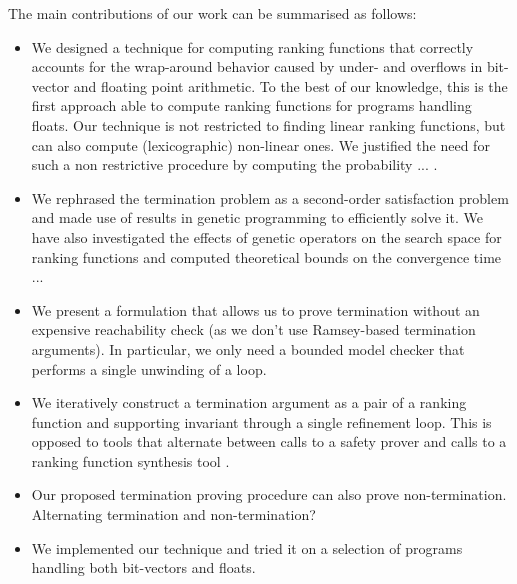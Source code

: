 \documentclass[preprint]{sigplanconf}
\theoremstyle{definition}
\begin{document}
 The main contributions of our work can be summarised as follows:
\begin{itemize}
\item We designed a technique for computing ranking functions that correctly accounts for the wrap-around behavior caused by under- and overflows in bit-vector and floating point arithmetic. To the best of our knowledge, this is the first approach able to compute ranking functions for programs handling floats. Our technique is not restricted to finding linear ranking functions, but can also compute (lexicographic) non-linear  ones. We justified the need for such a non restrictive procedure by computing the probability ... .
\item  We rephrased the termination problem as a second-order satisfaction problem and made 
use of results in genetic programming to efficiently solve it. We have also investigated the effects of genetic operators on the search space for ranking functions and computed theoretical 
bounds on the convergence time ...
\item We present a formulation that allows us to prove termination without an expensive reachability check (as we don't use Ramsey-based termination arguments).  In particular,
we only need a bounded model checker that performs a single unwinding of a loop.

\item We iteratively construct a termination argument as a pair of a ranking function and supporting invariant through a single refinement loop.
This is opposed to tools that alternate between calls to a safety prover and calls to a ranking function synthesis tool \cite{}.

\item Our proposed termination proving procedure can also prove non-termination. Alternating termination and non-termination? 

\item We implemented our technique and tried it on a selection of programs handling both bit-vectors and floats.

\end{itemize}
\end{document}
